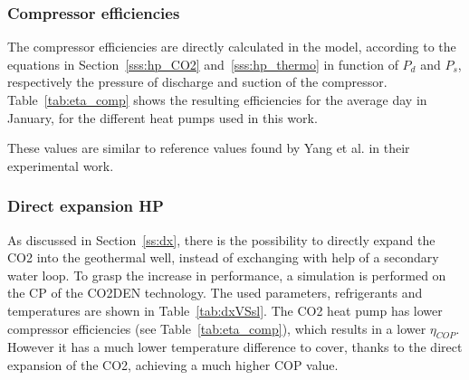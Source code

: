 \documentclass{article}
\begin{document}
\subsubsection{Compressor efficiencies}
The compressor efficiencies are directly calculated in the model, according to the equations in Section~\ref{sss:hp_CO2} and~\ref{sss:hp_thermo} in function of $P_{d}$ and $P_{s}$, respectively the pressure of discharge and suction of the compressor. Table~\ref{tab:eta_comp} shows the resulting efficiencies for the average day in January, for the different heat pumps used in this work.



These values are similar to reference values found by Yang et al.\cite{yangTheoreticalExperimentalInvestigation2016} in their experimental work.




\subsubsection{Direct expansion HP}\label{sss:DX}
As discussed in Section~\ref{ss:dx}, there is the possibility to directly expand the CO2 into the geothermal well, instead of exchanging with help of a secondary water loop. To grasp the increase in performance, a simulation is performed on the CP of the CO2DEN technology. The used parameters, refrigerants and temperatures are shown in Table~\ref{tab:dxVSsl}. The CO2 heat pump has lower compressor efficiencies (see Table~\ref{tab:eta_comp}), which results in a lower $\eta_{COP}$. However it has a much lower temperature difference to cover, thanks to the direct expansion of the CO2, achieving a much higher COP value.


\end{document}
